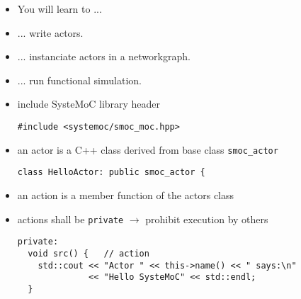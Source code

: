 \begin{frame}
\begin{itemize}
\item You will learn to ...
\item ... write actors.
\item ... instanciate actors in a networkgraph.
\item ... run functional simulation.
\end{itemize}
\end{frame}




\begin{frame}[fragile=singleslide]
\begin{itemize}
\item include SysteMoC library header
\begin{lstlisting}
#include <systemoc/smoc_moc.hpp>
\end{lstlisting}
\item an actor is a C++ class derived from base class \lstinline!smoc_actor!
\begin{lstlisting}
class HelloActor: public smoc_actor {
\end{lstlisting}
\item an action is a member function of the actors class
\item actions shall be \lstinline!private! $\rightarrow$ prohibit execution by others
\begin{lstlisting}
private:
  void src() {   // action
    std::cout << "Actor " << this->name() << " says:\n"
              << "Hello SysteMoC" << std::endl;
  }
\end{lstlisting}
\end{itemize}
\end{frame}

